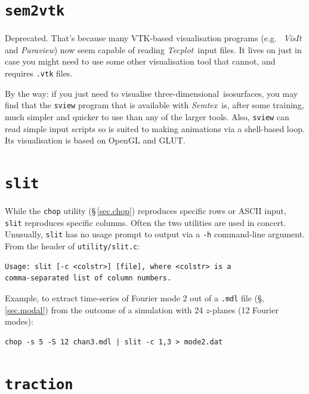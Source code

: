 \documentclass[11pt]{report}
\newcommand{\Semtex}{\emph{Semtex}} \newcommand{\Dog}{\emph{Dog}}
\newcommand{\Tecplot}{\emph{Tecplot}}
\newcommand\threed{three-di\-men\-sion\-al}
\newcommand{\eg}{e.g.\ } \newcommand{\CC}{\mathrm{c.c.}}
\begin{document}
\section{\texttt{sem2vtk}}
\label{sec.sem2vtk}

Deprecated.  That's because many VTK-based visualisation programs (\eg
\emph{VisIt} and \emph{Paraview}) now seem capable of reading
\Tecplot\ input files.  It lives on just in case you might need to use
some other visualisation tool that cannot, and requires \verb|.vtk|
files.

By the way: if you just need to visualise \threed\ isosurfaces, you
may find that the \verb|sview| program that is available with
\Semtex\ is, after some training, much simpler and quicker to use than
any of the larger tools.  Also, \verb|sview| can read simple input
scripts so is suited to making animations via a shell-based loop.  Its
visualisation is based on OpenGL and GLUT.

\section{\texttt{slit}}
\label{sec.slit}

While the \verb|chop| utility (\S\,\ref{sec.chop}) reproduces specific
rows or ASCII input, \verb|slit| reproduces specific columns.  Often
the two utilities are used in concert.  Unusually, \verb|slit| has no
usage prompt to output via a \verb|-h| command-line argument.  From
the header of \verb|utility/slit.c|:
%
{\small
\begin{verbatim}
Usage: slit [-c <colstr>] [file], where <colstr> is a
comma-separated list of column numbers.
\end{verbatim}
}
%
Example, to extract time-series of Fourier mode 2 out of a \verb|.mdl|
file (\S,\ref{sec.modal}) from the outcome of a simulation with 24
$z$-planes (12 Fourier modes):
%
{\small
\begin{verbatim}
chop -s 5 -S 12 chan3.mdl | slit -c 1,3 > mode2.dat
\end{verbatim}
}
%

\section{\texttt{traction}}
\label{sec.tractionu}
\end{document}

